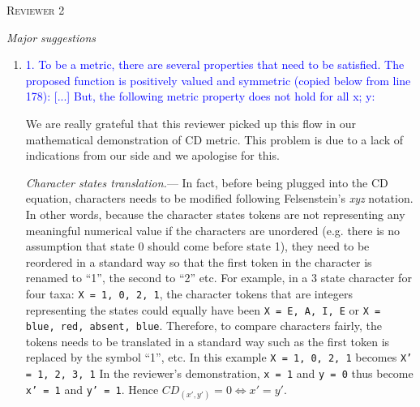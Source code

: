 \documentclass[12pt,letterpaper]{article}
\renewcommand{\section}[1]{%
\bigskip
\begin{center}
\begin{Large}
\normalfont\scshape #1
\medskip
\end{Large}
\end{center}}
\renewcommand{\subsection}[1]{%
\bigskip
\begin{center}
\begin{large}
\normalfont\itshape #1
\end{large}
\end{center}}
\renewcommand{\subsubsection}[1]{%
\vspace{2ex}
\noindent
\textit{#1.}---}
\begin{document}
%
%





\section{Reviewer 2}

\subsection{Major suggestions}

\begin{enumerate}

\item{\textcolor{blue}{1. To be a metric, there are several properties that need to be satisfied. The proposed function
is positively valued and symmetric (copied below from line 178): [...] But, the following metric property does not hold for all x; y:}}
\label{proof}

We are really grateful that this reviewer picked up this flow in our mathematical demonstration of CD metric.
This problem is due to a lack of indications from our side and we apologise for this.

\subsubsection{Character states translation}
In fact, before being plugged into the CD equation, characters needs to be modified following Felsenstein's \textit{xyz} notation.
In other words, because the character states tokens are not representing any meaningful numerical value if the characters are unordered (e.g. there is no assumption that state 0 should come before state 1), they need to be reordered in a standard way so that the first token in the character is renamed to ``1'', the second to ``2'' etc.
For example, in a 3 state character for four taxa: \texttt{X = {1, 0, 2, 1}}, the character tokens that are integers representing the states could equally have been \texttt{X = {E, A, I, E}} or \texttt{X = {blue, red, absent, blue}}.
Therefore, to compare characters fairly, the tokens needs to be translated in a standard way such as the first token is replaced by the symbol ``1'', etc.
In this example \texttt{X = {1, 0, 2, 1}} becomes \texttt{X' = {1, 2, 3, 1}}
In the reviewer's demonstration, \texttt{x  = {1}} and \texttt{y  = {0}} thus become \texttt{x' = {1}} and \texttt{y' = {1}}.
Hence $CD_{(x',y')} = 0 \Leftrightarrow x' = y'$.


\end{enumerate}
\end{document}
